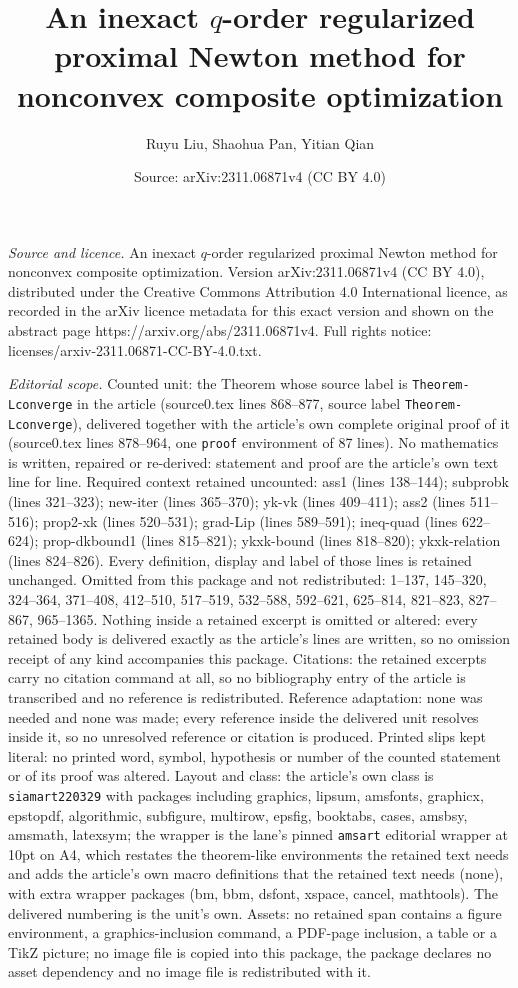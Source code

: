 \documentclass[10pt,a4paper]{amsart}
\title[An inexact $q$-order regularized proximal Newton method for ]{An inexact $q$-order regularized proximal Newton method for nonconvex composite optimization}
\author{Ruyu Liu, Shaohua Pan, Yitian Qian}
\date{Source: arXiv:2311.06871v4 (CC BY 4.0)}
\begin{document}
\maketitle

\noindent\emph{Source and licence.} An inexact $q$-order regularized proximal Newton method for nonconvex composite optimization. Version arXiv:2311.06871v4 (CC BY 4.0), distributed under the Creative Commons Attribution 4.0 International licence, as recorded in the arXiv licence metadata for this exact version and shown on the abstract page https://arxiv.org/abs/2311.06871v4. Full rights notice: licenses/arxiv-2311.06871-CC-BY-4.0.txt.\par\smallskip

\noindent\textit{Editorial scope.} Counted unit: the Theorem whose source label is \texttt{Theorem-Lconverge} in the article (source0.tex lines 868--877, source label \texttt{Theorem-Lconverge}), delivered together with the article's own complete original proof of it (source0.tex lines 878--964, one \texttt{proof} environment of 87 lines). No mathematics is written, repaired or re-derived: statement and proof are the article's own text line for line. Required context retained uncounted: ass1 (lines 138--144); subprobk (lines 321--323); new-iter (lines 365--370); yk-vk (lines 409--411); ass2 (lines 511--516); prop2-xk (lines 520--531); grad-Lip (lines 589--591); ineq-quad (lines 622--624); prop-dkbound1 (lines 815--821); ykxk-bound (lines 818--820); ykxk-relation (lines 824--826). Every definition, display and label of those lines is retained unchanged. Omitted from this package and not redistributed: 1--137, 145--320, 324--364, 371--408, 412--510, 517--519, 532--588, 592--621, 625--814, 821--823, 827--867, 965--1365. Nothing inside a retained excerpt is omitted or altered: every retained body is delivered exactly as the article's lines are written, so no omission receipt of any kind accompanies this package. Citations: the retained excerpts carry no citation command at all, so no bibliography entry of the article is transcribed and no reference is redistributed. Reference adaptation: none was needed and none was made; every reference inside the delivered unit resolves inside it, so no unresolved reference or citation is produced. Printed slips kept literal: no printed word, symbol, hypothesis or number of the counted statement or of its proof was altered. Layout and class: the article's own class is \texttt{siamart220329} with packages including graphics, lipsum, amsfonts, graphicx, epstopdf, algorithmic, subfigure, multirow, epsfig, booktabs, cases, amsbsy, amsmath, latexsym; the wrapper is the lane's pinned \texttt{amsart} editorial wrapper at 10pt on A4, which restates the theorem-like environments the retained text needs and adds the article's own macro definitions that the retained text needs (none), with extra wrapper packages (bm, bbm, dsfont, xspace, cancel, mathtools). The delivered numbering is the unit's own. Assets: no retained span contains a figure environment, a graphics-inclusion command, a PDF-page inclusion, a table or a TikZ picture; no image file is copied into this package, the package declares no asset dependency and no image file is redistributed with it. 
\end{document}

